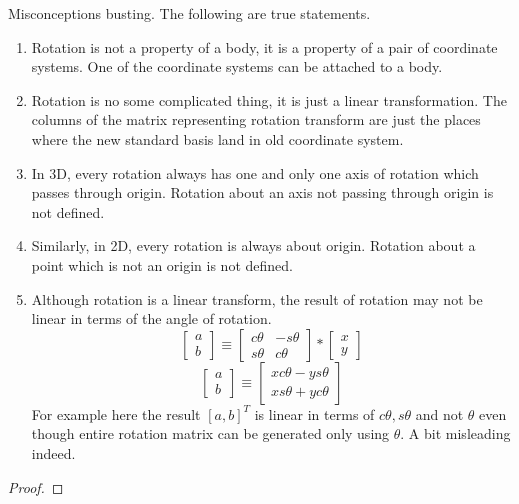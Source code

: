 \documentclass[../main.tex]{subfiles}
\begin{document}
{Misconceptions busting. The following are true statements.
\begin{enumerate}[nolistsep]
  \item Rotation is not a property of a body, it is a property of a pair of coordinate systems. One of the coordinate systems can be attached to a body.
  \item Rotation is no some complicated thing, it is just a linear transformation. The columns of the matrix representing rotation transform are just the places where the new standard basis land in old coordinate system.
  \item In 3D, every rotation always has one and only one axis of rotation which passes through origin. Rotation about an axis not passing through origin is not defined.
  \item Similarly, in 2D, every rotation is always about origin. Rotation about a point which is not an origin is not defined.
  \item Although rotation is a linear transform, the result of rotation may not be linear in terms of the angle of rotation.
  \[
    \begin{bmatrix}
        a \\
        b
    \end{bmatrix}
    \equiv
    \begin{bmatrix}
        c\theta & -s\theta \\
        s\theta & c\theta
    \end{bmatrix}
    *
    \begin{bmatrix}
        x \\
        y
    \end{bmatrix}
  \]
  \[
    \begin{bmatrix}
        a \\
        b
    \end{bmatrix}
    \equiv
    \begin{bmatrix}
        xc\theta - ys\theta \\
        xs\theta + yc\theta
    \end{bmatrix}
  \]
  For example here the result $[a, b]^T$ is linear in terms of $c\theta, s\theta$ and not $\theta$ even though entire rotation matrix can be generated only using $\theta$.
  A bit misleading indeed.
\end{enumerate}

\par}
\begin{proof}
\proofbydefinition
\end{proof}\par
\end{document}
